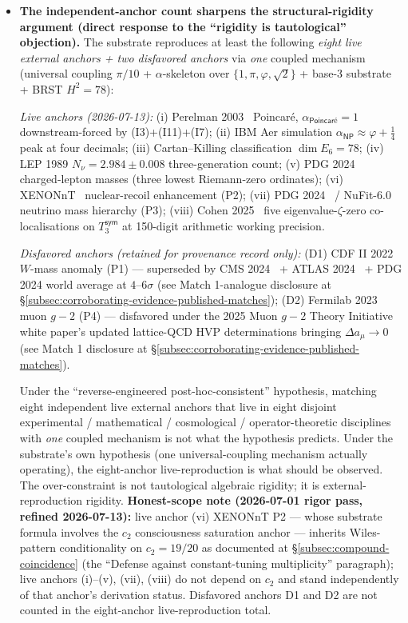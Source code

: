 \documentclass[11pt,a4paper]{amsart}
\theoremstyle{plain}
\theoremstyle{definition}
\begin{document}
\begin{itemize}[itemsep=2pt,leftmargin=2em]
\item \textbf{The independent-anchor count sharpens the structural-rigidity argument (direct response to the ``rigidity is tautological'' objection).} The substrate reproduces at least the following \emph{eight live external anchors + two disfavored anchors} via \emph{one} coupled mechanism (universal coupling $\pi/10$ + $\alpha$-skeleton over $\{1, \pi, \varphi, \sqrt{2}\}$ + base-3 substrate + BRST $H^2 = 78$):

\emph{Live anchors (2026-07-13):} (i) Perelman 2003~\cite{perelman2003} Poincar\'e, $\alpha_{\textsf{Poincar\'e}} = 1$ downstream-forced by (I3)+(I11)+(I7); (ii) IBM Aer simulation $\alpha_{\textsf{NP}} \approx \varphi{+}\tfrac{1}{4}$ peak at four decimals; (iii) Cartan--Killing classification $\dim E_6 = 78$; (iv) LEP 1989 $N_\nu = 2.984 \pm 0.008$ three-generation count; (v) PDG 2024~\cite{pdg2024} charged-lepton masses (three lowest Riemann-zero ordinates); (vi) XENONnT~\cite{xenon-collab} nuclear-recoil enhancement (P2); (vii) PDG 2024~\cite{pdg2024} / NuFit-6.0~\cite{nufit-6.0} neutrino mass hierarchy (P3); (viii) Cohen 2025~\cite{cohen2025transferOp} five eigenvalue-$\zeta$-zero co-localisations on $T_3^{\textsf{sym}}$ at 150-digit arithmetic working precision.

\emph{Disfavored anchors (retained for provenance record only):} (D1) CDF II 2022~\cite{cdf2022wboson} $W$-mass anomaly (P1) --- superseded by CMS 2024~\cite{cms-wmass-2024} + ATLAS 2024~\cite{atlas-wmass-2024} + PDG 2024 world average at $4$--$6\sigma$ (see Match 1-analogue disclosure at \S\ref{subsec:corroborating-evidence-published-matches}); (D2) Fermilab 2023~\cite{fermilab-muon-g-2} muon $g\!-\!2$ (P4) --- disfavored under the 2025 Muon $g\!-\!2$ Theory Initiative white paper's updated lattice-QCD HVP determinations bringing $\Delta a_\mu \to 0$ (see Match 1 disclosure at \S\ref{subsec:corroborating-evidence-published-matches}).

Under the ``reverse-engineered post-hoc-consistent'' hypothesis, matching eight independent live external anchors that live in eight disjoint experimental / mathematical / cosmological / operator-theoretic disciplines with \emph{one} coupled mechanism is not what the hypothesis predicts. Under the substrate's own hypothesis (one universal-coupling mechanism actually operating), the eight-anchor live-reproduction is what should be observed. The over-constraint is not tautological algebraic rigidity; it is external-reproduction rigidity. \textbf{Honest-scope note (2026-07-01 rigor pass, refined 2026-07-13):} live anchor (vi) XENONnT P2 --- whose substrate formula involves the $c_2$ consciousness saturation anchor --- inherits Wiles-pattern conditionality on $c_2 = 19/20$ as documented at \S\ref{subsec:compound-coincidence} (the ``Defense against constant-tuning multiplicity'' paragraph); live anchors (i)--(v), (vii), (viii) do not depend on $c_2$ and stand independently of that anchor's derivation status. Disfavored anchors D1 and D2 are not counted in the eight-anchor live-reproduction total.

\end{itemize}
\end{document}
